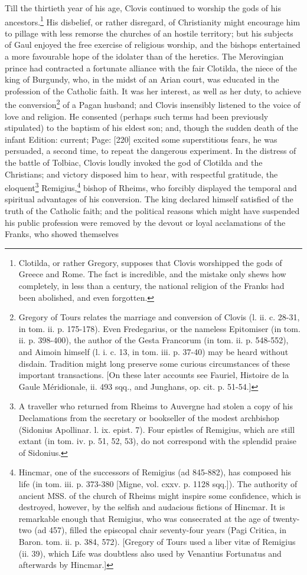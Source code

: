 Till the thirtieth year of his age, Clovis continued to worship the gods of his ancestors.\footnote{Clotilda, or rather Gregory, supposes that Clovis worshipped the gods of Greece and Rome. The fact is incredible, and the mistake only shews how completely, in less than a century, the national religion of the Franks had been abolished, and even forgotten.} His disbelief, or rather disregard, of Christianity might encourage him to pillage with less remorse the churches of an hostile territory; but his subjects of Gaul enjoyed the free exercise of religious worship, and the bishops entertained a more favourable hope of the idolater than of the heretics. The Merovingian prince had contracted a fortunate alliance with the fair Clotilda, the niece of the king of Burgundy, who, in the midst of an Arian court, was educated in the profession of the Catholic faith. It was her interest, as well as her duty, to achieve the conversion\footnote{Gregory of Tours relates the marriage and conversion of Clovis (l. ii. c. 28-31, in tom. ii. p. 175-178). Even Fredegarius, or the nameless Epitomiser (in tom. ii. p. 398-400), the author of the Gesta Francorum (in tom. ii. p. 548-552), and Aimoin himself (l. i. c. 13, in tom. iii. p. 37-40) may be heard without disdain. Tradition might long preserve some curious circumstances of these important transactions. [On these later accounts see Fauriel, Histoire de la Gaule Méridionale, ii. 493 sqq., and Junghans, op. cit. p. 51-54.]} of a Pagan husband; and Clovis insensibly listened to the voice of love and religion. He consented (perhaps such terms had been previously stipulated) to the baptism of his eldest son; and, though the sudden death of the infant Edition: current; Page: [220] excited some superstitious fears, he was persuaded, a second time, to repeat the dangerous experiment. In the distress of the battle of Tolbiac, Clovis loudly invoked the god of Clotilda and the Christians; and victory disposed him to hear, with respectful gratitude, the eloquent\footnote{A traveller who returned from Rheims to Auvergne had stolen a copy of his Declamations from the secretary or bookseller of the modest archbishop (Sidonius Apollinar. l. ix. epist. 7). Four epistles of Remigius, which are still extant (in tom. iv. p. 51, 52, 53), do not correspond with the splendid praise of Sidonius.} Remigius,\footnote{Hincmar, one of the successors of Remigius (ad 845-882), has composed his life (in tom. iii. p. 373-380 [Migne, vol. cxxv. p. 1128 sqq.]). The authority of ancient MSS. of the church of Rheims might inspire some confidence, which is destroyed, however, by the selfish and audacious fictions of Hincmar. It is remarkable enough that Remigius, who was consecrated at the age of twenty-two (ad 457), filled the episcopal chair seventy-four years (Pagi Critica, in Baron. tom. ii. p. 384, 572). [Gregory of Tours used a liber vitæ of Remigius (ii. 39), which Life was doubtless also used by Venantius Fortunatus and afterwards by Hincmar.]} bishop of Rheims, who forcibly displayed the temporal and spiritual advantages of his conversion. The king declared himself satisfied of the truth of the Catholic faith; and the political reasons which might have suspended his public profession were removed by the devout or loyal acclamations of the Franks, who showed themselves 